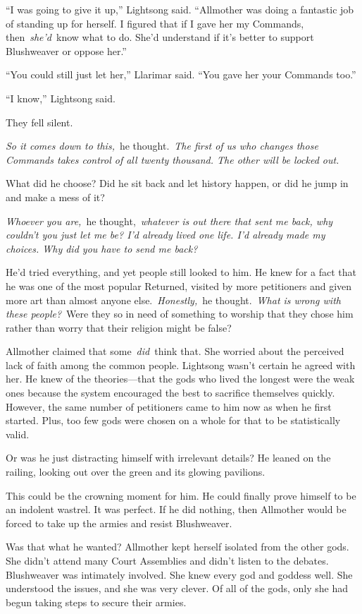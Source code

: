 “I was going to give it up,” Lightsong said. “Allmother was doing a fantastic job of standing up for herself. I figured that if I gave her my Commands, then~\textit{she’d}~know what to do. She’d understand if it’s better to support Blushweaver or oppose her.”

“You could still just let her,” Llarimar said. “You gave her your Commands too.”

“I know,” Lightsong said.

They fell silent.

\textit{So it comes down to this,}~he thought.~\textit{The first of us who changes those Commands takes control of all twenty thousand. The other will be locked out.}

What did he choose? Did he sit back and let history happen, or did he jump in and make a mess of it?

\textit{Whoever you are,}~he thought,~\textit{whatever is out there that sent me back, why couldn’t you just let me be? I’d already lived one life. I’d already made my choices. Why did you have to send me back?}

He’d tried everything, and yet people still looked to him. He knew for a fact that he was one of the most popular Returned, visited by more petitioners and given more art than almost anyone else.~\textit{Honestly,}~he thought.~\textit{What is wrong with these people?}~Were they so in need of something to worship that they chose him rather than worry that their religion might be false?

Allmother claimed that some~\textit{did}~think that. She worried about the perceived lack of faith among the common people. Lightsong wasn’t certain he agreed with her. He knew of the theories—that the gods who lived the longest were the weak ones because the system encouraged the best to sacrifice themselves quickly. However, the same number of petitioners came to him now as when he first started. Plus, too few gods were chosen on a whole for that to be statistically valid.

Or was he just distracting himself with irrelevant details? He leaned on the railing, looking out over the green and its glowing pavilions.

This could be the crowning moment for him. He could finally prove himself to be an indolent wastrel. It was perfect. If he did nothing, then Allmother would be forced to take up the armies and resist Blushweaver.

Was that what he wanted? Allmother kept herself isolated from the other gods. She didn’t attend many Court Assemblies and didn’t listen to the debates. Blushweaver was intimately involved. She knew every god and goddess well. She understood the issues, and she was very clever. Of all of the gods, only she had begun taking steps to secure their armies.

